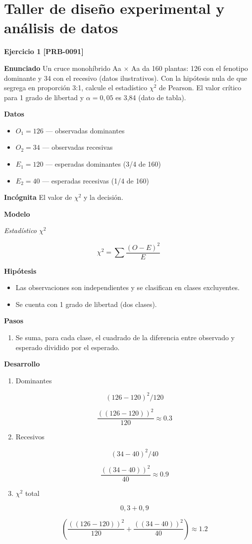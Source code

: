 \documentclass{book}
\begin{document}
\section{Taller de diseño experimental y análisis de datos}

\noindent\textbf{Ejercicio 1 [PRB-0091]}

\noindent\textbf{Enunciado}
Un cruce monohíbrido Aa \(\times\) Aa da 160 plantas: 126 con el fenotipo dominante y 34 con el recesivo (datos ilustrativos). Con la hipótesis nula de que segrega en proporción 3:1, calcule el estadístico \(\chi^{2}\) de Pearson. El valor crítico para 1 grado de libertad y \(\alpha = 0,05\) es 3,84 (dato de tabla).


\noindent\textbf{Datos}
\begin{itemize}
\item $O_{1} = 126$ — observadas dominantes
\item $O_{2} = 34$ — observadas recesivas
\item $E_{1} = 120$ — esperadas dominantes (3/4 de 160)
\item $E_{2} = 40$ — esperadas recesivas (1/4 de 160)
\end{itemize}

\noindent\textbf{Incógnita}
El valor de \(\chi^{2}\) y la decisión.


\noindent\textbf{Modelo}

\noindent\textit{Estadístico \(\chi^{2}\)}

\[
\chi^2 = \sum \frac{(O-E)^2}{E}
\]

\noindent\textbf{Hipótesis}
\begin{itemize}
\item Las observaciones son independientes y se clasifican en clases excluyentes.
\item Se cuenta con 1 grado de libertad (dos clases).
\end{itemize}

\noindent\textbf{Pasos}
\begin{enumerate}
\item
Se suma, para cada clase, el cuadrado de la diferencia entre observado y esperado dividido por el esperado.

\end{enumerate}

\noindent\textbf{Desarrollo}
\begin{enumerate}
\item
Dominantes


\[
(126-120)^{2}/120
\]

\[
\frac{\left(\left(126-120\right)\right)^{2}}{120} \approx 0.3
\]
\item
Recesivos


\[
(34-40)^{2}/40
\]

\[
\frac{\left(\left(34-40\right)\right)^{2}}{40} \approx 0.9
\]
\item
\(\chi^{2}\) total


\[
0,3 + 0,9
\]

\[
\left(\frac{\left(\left(126-120\right)\right)^{2}}{120}+\frac{\left(\left(34-40\right)\right)^{2}}{40}\right) \approx 1.2
\]
\end{enumerate}
\end{document}
